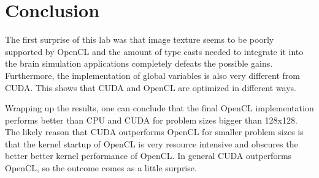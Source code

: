 \documentclass[final]{report}
\begin{document}
\chapter{Conclusion}
The first surprise of this lab was that image texture seems to be poorly supported by OpenCL and the amount of type casts needed to integrate it into the brain simulation applications completely defeats the possible gains.
Furthermore, the implementation of global variables is also very different from CUDA.
This shows that CUDA and OpenCL are optimized in different ways.

Wrapping up the results, one can conclude that the final OpenCL implementation performs better than CPU and CUDA for problem sizes bigger than 128x128.
The likely reason that CUDA outperforms OpenCL for smaller problem sizes is that the kernel startup of OpenCL is very resource intensive and obscures the better better kernel performance of OpenCL.
In general CUDA outperforms OpenCL, so the outcome comes as a little surprise.
\end{document}
